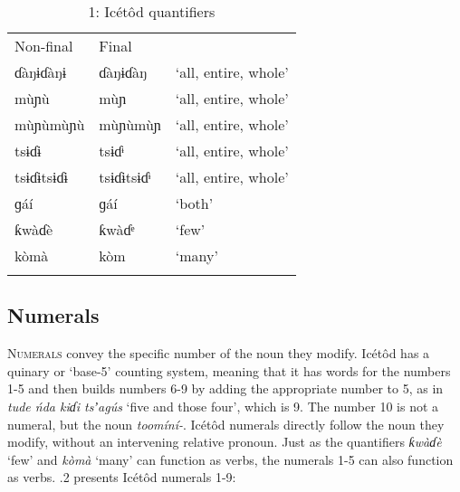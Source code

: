 \begin{table}
\caption{1: Icétôd quantifiers}
\label{tab:3}


\begin{tabularx}{\textwidth}{XXX}
\lsptoprule

Non-final & Final & \\
ɗàŋɨɗàŋɨ & ɗàŋɨɗàŋ & ‘all, entire, whole’\\
mùɲù & mùɲ & ‘all, entire, whole’\\
mùɲùmùɲù & mùɲùmùɲ & ‘all, entire, whole’\\
tsɨɗɨ & tsɨɗᶤ & ‘all, entire, whole’\\
tsɨɗɨtsɨɗɨ & tsɨɗɨtsɨɗᶤ & ‘all, entire, whole’\\
ɡáí & ɡáí & ‘both’\\
ƙwàɗè & ƙwàɗᵉ & ‘few’\\
kòmà & kòm & ‘many’\\
\lspbottomrule
\end{tabularx}
\end{table}



\subsection{Numerals}


\textsc{Numerals} convey the specific number of the noun they modify. Icétôd has a quinary or ‘base-5’ counting system, meaning that it has words for the numbers 1-5 and then builds numbers 6-9 by adding the appropriate number to 5, as in \textit{tude ńda kiɗi tsʼagús }‘five and those four’, which is 9. The number 10 is not a numeral, but the noun \textit{toomíní-}. Icétôd numerals directly follow the noun they modify, without an intervening relative pronoun. Just as the quantifiers \textit{ƙwàɗè }‘few’ and \textit{kòmà }‘many’ can function as verbs, the numerals 1-5 can also function as verbs. .2 presents Icétôd numerals 1-9:


